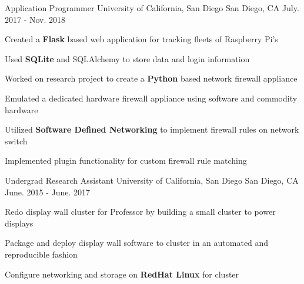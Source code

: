 \begin{cventries}
  \cventry
    {Application Programmer} %
    {University of California, San Diego} %
    {San Diego, CA} %
    {July. 2017 - Nov. 2018} %
    {
      \begin{cvitems} %
        \item{ Created a \textbf{Flask} based web application for tracking fleets of Raspberry Pi's }
        \item{ Used \textbf{SQLite} and SQLAlchemy to store data and login information}
        \item{ Worked on research project to create a \textbf{Python} based network firewall appliance }
        \item{ Emulated a dedicated hardware firewall appliance using software and commodity hardware }
        \item {Utilized \textbf{Software Defined Networking} to implement firewall rules on network switch }
        \item { Implemented plugin functionality for custom firewall rule matching }
      \end{cvitems}
    }

  \cventry
    {Undergrad Research Assistant} %
    {University of California, San Diego} %
    {San Diego, CA} %
    {June. 2015 - June. 2017} %
    {
      \begin{cvitems} %
        \item{ Redo display wall cluster for Professor by building a small cluster to power displays }
        \item{ Package and deploy display wall software to cluster in an automated and reproducible fashion}
        \item{ Configure networking and storage on \textbf{RedHat Linux} for cluster }
      \end{cvitems}
    }


\end{cventries}
